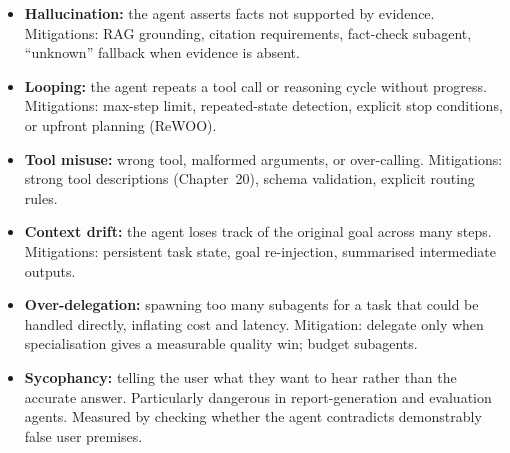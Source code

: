 \begin{itemize}
  \item \textbf{Hallucination:} the agent asserts facts not supported by evidence.
    Mitigations: RAG grounding, citation requirements, fact-check subagent,
    ``unknown'' fallback when evidence is absent.

  \item \textbf{Looping:} the agent repeats a tool call or reasoning cycle without
    progress. Mitigations: max-step limit, repeated-state detection, explicit stop
    conditions, or upfront planning (ReWOO).

  \item \textbf{Tool misuse:} wrong tool, malformed arguments, or over-calling.
    Mitigations: strong tool descriptions (Chapter~20), schema validation, explicit
    routing rules.

  \item \textbf{Context drift:} the agent loses track of the original goal across
    many steps. Mitigations: persistent task state, goal re-injection, summarised
    intermediate outputs.

  \item \textbf{Over-delegation:} spawning too many subagents for a task that could
    be handled directly, inflating cost and latency. Mitigation: delegate only when
    specialisation gives a measurable quality win; budget subagents.

  \item \textbf{Sycophancy:} telling the user what they want to hear rather than
    the accurate answer. Particularly dangerous in report-generation and evaluation
    agents. Measured by checking whether the agent contradicts demonstrably false
    user premises.
\end{itemize}

